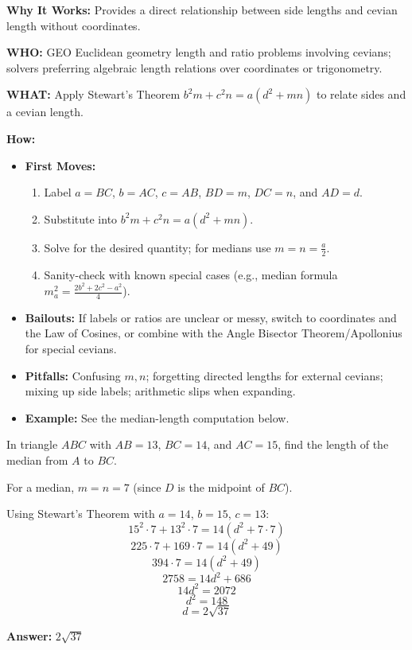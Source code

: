 \documentclass[12pt]{article}
\newenvironment{problem}[1]
{\begin{tcolorbox}[colback=blue!5!white,colframe=blue!75!black,title={#1}]}{\end{tcolorbox}}
\newenvironment{solution}
{\begin{tcolorbox}[colback=green!5!white,colframe=green!75!black,title={Solution}]}{\end{tcolorbox}}
\begin{document}
\textbf{Why It Works:} Provides a direct relationship between side lengths and cevian length without coordinates.

\textbf{WHO:} GEO Euclidean geometry length and ratio problems involving cevians; solvers preferring algebraic length relations over coordinates or trigonometry.

\textbf{WHAT:} Apply Stewart's Theorem \(b^2 m + c^2 n = a(d^2 + mn)\) to relate sides and a cevian length.


\textbf{How:}
\begin{itemize}
    \item \textbf{First Moves:}
    \begin{enumerate}[nosep]
        \item Label \(a=BC\), \(b=AC\), \(c=AB\), \(BD=m\), \(DC=n\), and \(AD=d\).
        \item Substitute into \(b^2 m + c^2 n = a(d^2 + mn)\).
        \item Solve for the desired quantity; for medians use \(m=n=\tfrac{a}{2}\).
        \item Sanity-check with known special cases (e.g., median formula \(m_a^2 = \tfrac{2b^2+2c^2-a^2}{4}\)).
    \end{enumerate}
    \item \textbf{Bailouts:} If labels or ratios are unclear or messy, switch to coordinates and the Law of Cosines, or combine with the Angle Bisector Theorem/Apollonius for special cevians.
    \item \textbf{Pitfalls:} Confusing \(m,n\); forgetting directed lengths for external cevians; mixing up side labels; arithmetic slips when expanding.
    \item \textbf{Example:} See the median-length computation below.
\end{itemize}

\begin{problem}{Example: Finding Median Length}
In triangle $ABC$ with $AB = 13$, $BC = 14$, and $AC = 15$, find the length of the median from $A$ to $BC$.
\end{problem}

\begin{solution}
For a median, $m = n = 7$ (since $D$ is the midpoint of $BC$).

Using Stewart's Theorem with $a = 14$, $b = 15$, $c = 13$:
$$15^2 \cdot 7 + 13^2 \cdot 7 = 14(d^2 + 7 \cdot 7)$$
$$225 \cdot 7 + 169 \cdot 7 = 14(d^2 + 49)$$
$$394 \cdot 7 = 14(d^2 + 49)$$
$$2758 = 14d^2 + 686$$
$$14d^2 = 2072$$
$$d^2 = 148$$
$$d = 2\sqrt{37}$$

\textbf{Answer:} $2\sqrt{37}$
\end{solution}
\end{document}
